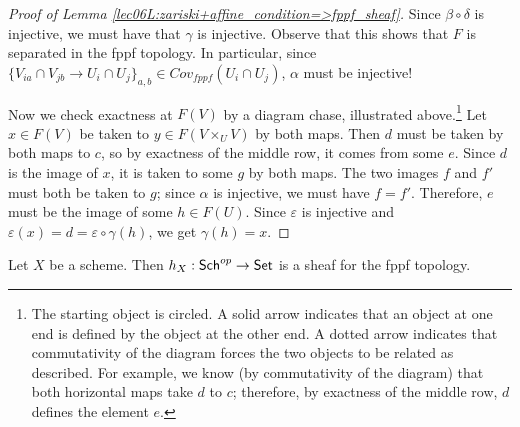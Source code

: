\begin{proof}[Proof of Lemma \ref{lec06L:zariski+affine_condition=>fppf_sheaf}]
  Since $\beta\circ \delta$ is injective, we must have that $\gamma$ is injective.
  Observe that this shows that $F$ is separated in the fppf topology. In particular,
  since $\{V_{ia}\cap V_{jb}\to U_i\cap U_j\}_{a,b}\in Cov_{fppf}(U_i\cap U_j)$,
  $\alpha$ must be injective!

  Now we check exactness at $F(V)$ by a diagram chase, illustrated above.\footnote{\label{lec06:footnote_on_chasing}The
  starting object is circled. A solid arrow indicates that an object at one end is
  defined by the object at the other end. A dotted arrow indicates that commutativity of
  the diagram forces the two objects to be related as described. For example, we know
  (by commutativity of the diagram) that both horizontal maps take $d$ to $c$;
  therefore, by exactness of the middle row, $d$ defines the element $e$.} Let $x\in
  F(V)$ be taken to $y\in F(V\times_U V)$ by both maps. Then $d$ must be taken by both
  maps to $c$, so by exactness of the middle row, it comes from some $e$. Since $d$ is
  the image of $x$, it is taken to some $g$ by both maps. The two images $f$ and $f'$
  must both be taken to $g$; since $\alpha$ is injective, we must have $f=f'$.
  Therefore, $e$ must be the image of some $h\in F(U)$. Since $\varepsilon$ is injective
  and $\varepsilon(x)=d=\varepsilon\circ \gamma(h)$, we get $\gamma(h)=x$.
\end{proof}
\begin{theorem}\label{lec06T:hXfppfsheaf}
  Let $X$ be a scheme. Then $h_X:\text{\sf Sch}^{op}\to \text{\sf Set}$ is a sheaf for the fppf
  topology.
\end{theorem}
